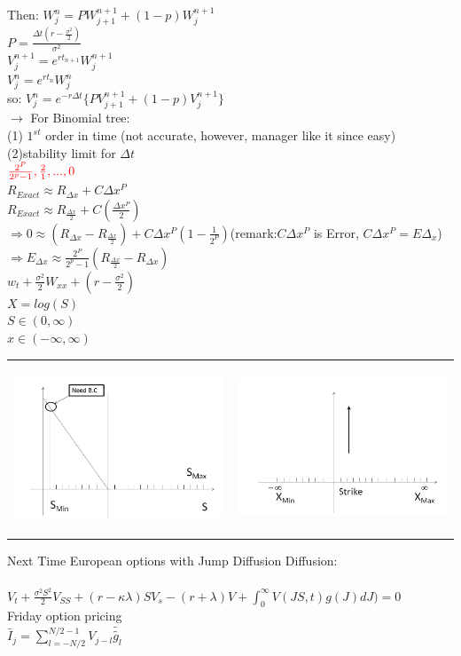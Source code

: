 \documentclass{article}
\begin{document}
{Then: $W_j^{n}=PW_{j+1}^{n+1}+(1-p)W_j^{n+1}$\\
$P=\frac{\Delta t(r-\frac{\sigma^2}{2})}{\sigma^2}$\\
$V_j^{n+1}=e^{rt_{n+1}}W_j^{n+1}$\\
$V_j^{n}=e^{rt_{n}}W_j^{n}$\\
so: $V_j^n=e^{-r\Delta t}\{PV_{j+1}^{n+1}+(1-p)V_j^{n+1}\}$\\
$\rightarrow$ For Binomial tree:\\
(1) $1^{st}$ order in time (not accurate, however, manager like it since easy)\\
(2)stability limit for $\Delta t$\\
$\color{red}{\frac{2^P}{2^p-1},\frac{2}{1},...,0}$\\
$R_{Exact}\approx R_{\Delta x} +C\Delta x^P$\\
$R_{Exact}\approx R_{\frac{\Delta x}{2}} +C(\frac{\Delta x^P}{2})$\\
$\Rightarrow 0\approx (R_{\Delta x}-R_{\frac{\Delta x}{2}})+C\Delta x^P(1-\frac{1}{2^P})$(remark:$C\Delta x^P$ is Error, $C\Delta x^P=E\Delta_x$)
$\Rightarrow E_{\Delta x}\approx \frac{2^P}{2^p-1}(R_{\frac{\Delta x}{2}}-R_{\Delta x})$\\
$w_t+\frac{\sigma^2}{2}W_{xx}+(r-\frac{\sigma^2}{2})$\\
$X=log(S)
$\\
$S\in (0,\infty)$\\
$x\in (-\infty,\infty)$\\

\begin{table}[!htp]
\begin{tabular}{ll}
\includegraphics[height=2in,width=3in]{stock1.jpg}&\includegraphics[height=2in,width=3in]{stock2.jpg}
\end{tabular}
\end{table}
Next Time European options with Jump Diffusion Diffusion:\\
\\
$V_t+\frac{\sigma^2S^2}{2}V_{SS}+(r-\kappa \lambda)SV_s-(r+\lambda)V+\int_{0}^{\infty}V(JS,t)g(J)dJ)=0$\\

 Friday option pricing \\

$\widetilde{I_j}=\sum_{l=-N/2}^{N/2-1} V_{j-l}\tilde{\tilde{g_l}}$\\

}
\end{document}
